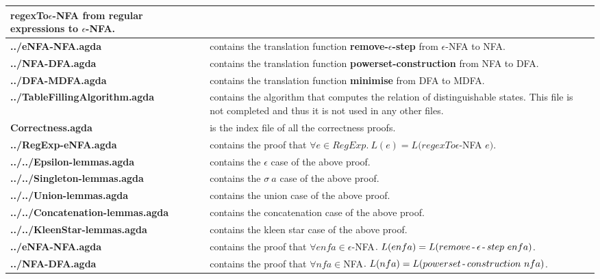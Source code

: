 \begin{center}
\begin{longtable}{| p{5.2cm} | p{8.3cm} |}
                                   \textbf{regexTo\(\epsilon\)-NFA} from regular
                                   expressions to \(\epsilon\)-NFA. \\
  \hline
\textbf{../eNFA-NFA.agda} & contains the translation function
                                   \textbf{remove-\(\epsilon\)-step}
                                from \(\epsilon\)-NFA to NFA. \\
                                \hline
\textbf{../NFA-DFA.agda} & contains the translation function
                                   \textbf{powerset-construction}
                                from NFA to DFA. \\
                                \hline
\textbf{../DFA-MDFA.agda} & contains the translation function
                                   \textbf{minimise}
                                from DFA to MDFA. \\
                                \hline
\textbf{../TableFillingAlgorithm.agda} & contains the algorithm
that computes the relation of distinguishable states. This file is not
completed and thus it is not used in any other files. \\
                                \hline
\textbf{Correctness.agda} & is the index file of all the correctness
                       proofs. \\ \hline
\textbf{../RegExp-eNFA.agda} & contains the proof that \(\forall
e\in RegExp.\ L(e) = L(regexTo\epsilon\)-NFA \(e)\). \\ \hline
\textbf{../../Epsilon-lemmas.agda} & contains the
\(\epsilon\) case of the above proof. \\ \hline
\textbf{../../Singleton-lemmas.agda} & contains the
\(\sigma\ a\) case of the above proof. \\ \hline
\textbf{../../Union-lemmas.agda} & contains the
union case of the above proof. \\ \hline
\textbf{../../Concatenation-lemmas.agda} & contains the
concatenation case of the above proof. \\ \hline
\textbf{../../KleenStar-lemmas.agda} & contains the
kleen star case of the above proof. \\ \hline
\textbf{../eNFA-NFA.agda} & contains the proof that \(\forall
enfa\in \epsilon\)-NFA\(.\ L(enfa) = L(remove\operatorname{-}\epsilon\operatorname{-}
step\ enfa)\). \\ \hline
\textbf{../NFA-DFA.agda} & contains the proof that \(\forall
nfa\in\)NFA\(.\ L(nfa) = L(powerset\hyphen construction\ nfa)\). \\ \hline

\end{longtable}
\end{center}
